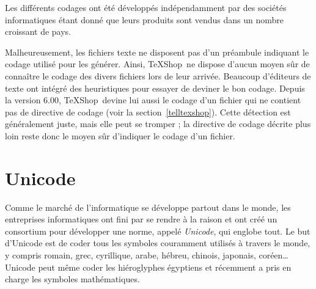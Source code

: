 \documentclass[11pt,french]{article}
\newcommand{\TS}{\textsf{\TeX Shop}}
\begin{document}
Les différents codages ont été développés indépendamment par des sociétés informatiques étant donné que leurs produits sont vendus dans un nombre croissant de pays. 

Malheureusement, les fichiers texte ne disposent pas d'un préambule indiquant le codage utilisé pour les générer. Ainsi, \TS\ ne dispose d'aucun moyen sûr de connaître le codage des divers fichiers lors de leur arrivée. Beaucoup d'éditeurs de texte ont intégré des heuristiques pour essayer de deviner le bon codage. Depuis la version 6.00, \TS\ devine lui aussi le codage d'un fichier qui ne contient pas de directive de codage (voir la section~\ref{telltexshop}). Cette détection est généralement juste, mais elle peut se tromper ; la directive de codage décrite plus loin reste donc le moyen sûr d'indiquer le codage d'un fichier.

\section{Unicode}

Comme le marché de l'informatique se développe partout dans le monde, les entreprises informatiques ont fini par se rendre à la raison et ont créé un consortium pour développer une norme, appelé {\em Unicode}, qui englobe tout. Le but d'Unicode est de coder tous les symboles couramment utilisés à travers le monde, y compris romain, grec, cyrillique, arabe, hébreu, chinois, japonais, coréen… Unicode peut même coder les hiéroglyphes égyptiens et récemment a pris en charge les symboles mathématiques.
\end{document}

